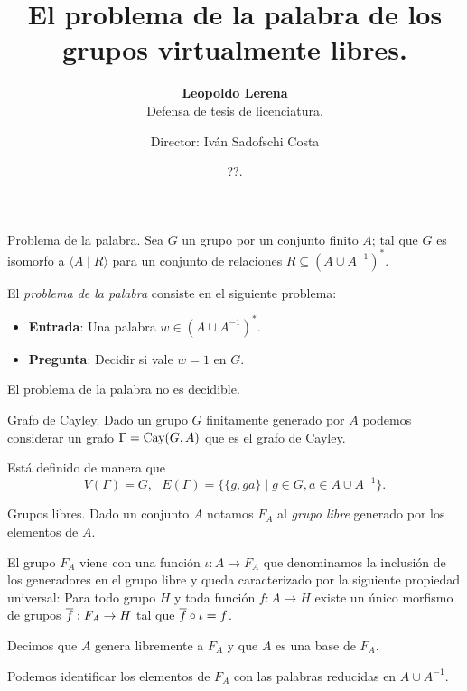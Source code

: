\documentclass[aspectratio=169, 11pt]{beamer}
\title{El problema de la palabra de los grupos virtualmente libres.}
\subtitle{\textbf{Leopoldo Lerena} \\
		Defensa de tesis de licenciatura.}
\date{??.}
\author{Director: Iván Sadofschi Costa}
\institute{Universidad de Buenos Aires}
\begin{document}
	\maketitle

	
	
	
	\begin{frame}[fragile]{Problema de la palabra.}
		Sea $G$ un grupo \fg por un conjunto finito $A$; 
		tal que $G$ es isomorfo a $\langle A \mid R \rangle$ para un conjunto de relaciones $R \subseteq (A \cup A^{-1})^*$.
		
		El \emph{problema de la palabra} consiste en el siguiente problema:
		\begin{itemize}
			\item 
				\textbf{Entrada}: Una palabra $w \in (A \cup A^{-1})^*$.
			
			\item 
				\textbf{Pregunta}: Decidir si vale $w=1$ en $G$.
		\end{itemize}
		
		\alert{El problema de la palabra no es decidible.}

	\end{frame}

	\begin{frame}[fragile]{Grafo de Cayley.}
		Dado un grupo $G$ finitamente generado por $A$ podemos considerar un grafo $\Gamma =\textrm{Cay}(G, A)$ que es el grafo de Cayley.

		Está definido de manera que 
		\[
			V(\Gamma) = G,   \ \ \ E(\Gamma) = \{ \{ g,ga \}  \mid g \in G, a \in A \cup A^{-1}  \}. 	
		\]

	\end{frame}
	
	\begin{frame}[fragile]{Grupos libres.}
		Dado un conjunto $A$ notamos $F_{A}$ al \emph{grupo libre} generado por los elementos de $A$. 

		El grupo $F_{A}$ viene con una función $\iota: A \to F_{A}$ que denominamos la inclusión de los generadores en el grupo libre y queda caracterizado por la siguiente propiedad universal: 
		Para todo grupo $H$ y toda función $f:A \to H$ existe un único morfismo de grupos $\overline f: F_{A} \to H$ tal que $\overline f \circ \iota = f$.
		\begin{center}
		\end{center}

		Decimos que $A$ genera libremente a $F_{A}$ y que $A$ es una base de $F_{A}$.

		Podemos identificar los elementos de $F_{A}$ con las palabras reducidas en $A \cup A^{-1}$.
	\end{frame}
\end{document}
